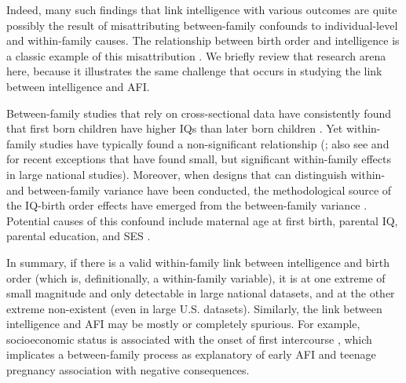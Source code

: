 Indeed, many such findings that link intelligence with various outcomes are quite possibly the result of misattributing between-family confounds to individual-level and within-family causes. The relationship between birth order and intelligence is a classic example of this misattribution \citep[See][]{damian2015associations,Rodgers2000,rodgers2014birth}. We briefly review that research arena here, because it illustrates the same challenge that occurs in studying the link between intelligence and AFI. 

Between-family studies that rely on cross-sectional data have consistently found that first born children have higher IQs than later born children \citep{belmont1973birth,zajonc1976family}. Yet within-family studies have typically found a non-significant relationship (\citealp{berbaum1980intellectual,galbraith1982sibling,retherford1991birth,rodgers1984confluence,Rodgers2000}; also see \citealp{barclay2015within} and \citealp{bjerkedal2007intelligence} for recent exceptions that have found small, but significant within-family effects in large national studies). Moreover, when designs that can distinguish within- and between-family variance have been conducted, the methodological source of the IQ-birth order effects have emerged from the between-family variance \citep{black2011older,rodgers1984confluence,Rodgers2000,Wichman2006,Wichman2007}. Potential causes of this confound include maternal age at first birth, parental IQ, parental education, and SES \citep[][also see \citet{Anastasi1956} for an insightful overview, written prior to the IQ-birth order debate]{page1979family,Rodgers2001admixture,Rodgers2008AJS}.

In summary, if there is a valid within-family link between intelligence and birth order (which is, definitionally, a within-family variable), it is at one extreme of small magnitude and only detectable in large national datasets, and at the other extreme non-existent (even in large U.S. datasets). Similarly, the link between intelligence and AFI may be mostly or completely spurious. For example, socioeconomic status is associated with the onset of first intercourse \citep{Lammers2000}, which implicates a between-family process as explanatory of early AFI and teenage pregnancy association with negative consequences.

